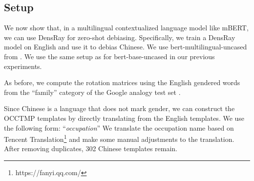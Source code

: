 \subsection{Setup}
We now show that, in a multilingual contextualized language
model like mBERT,
we can use DensRay  for zero-shot debiasing.
Specifically, we train a DensRay model on English and use it
to debias Chinese.
We use  bert-multilingual-uncased from
\citep{wolf2019huggingfaces}. We  use the same setup as
for bert-base-uncased in our previous experiments. 

As before, we compute the rotation matrices using the English gendered words from the ``family'' category of the Google analogy test set \citep{mikolov2013efficient}.

Since Chinese is a language that does not mark gender, we
can construct the OCCTMP templates by directly translating
from the English templates. We use the following form:
``\text{[MASK]}\textit{occupation}''
We translate the occupation name based on
Tencent
Translation\footnote{https://fanyi.qq.com/} and make some
manual adjustments to the translation. After removing 
duplicates,  302 Chinese templates remain.

